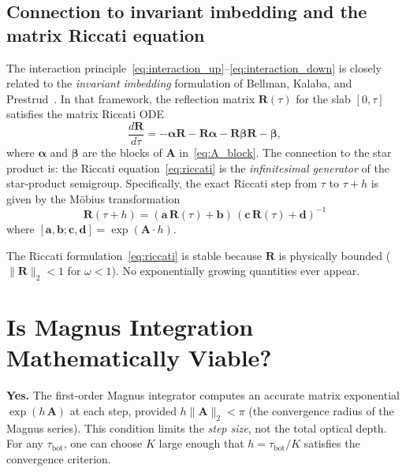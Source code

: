 \documentclass[11pt,a4paper]{article}
\newcommand{\mat}[1]{\mathbf{#1}}
\newcommand{\tbot}{\tau_{\mathrm{bot}}}
\theoremstyle{definition}
\begin{document}
\subsection{Connection to invariant imbedding and the matrix Riccati equation}

The interaction principle~\eqref{eq:interaction_up}--\eqref{eq:interaction_down}
is closely related to the \emph{invariant imbedding} formulation of
Bellman, Kalaba, and Prestrud~\cite{bellman1960}.  In that framework, the
reflection matrix $\mat{R}(\tau)$ for the slab $[0,\tau]$ satisfies the
matrix Riccati ODE
\begin{equation}\label{eq:riccati}
  \frac{d\mat{R}}{d\tau} = -\mat{\alpha}\mat{R} - \mat{R}\mat{\alpha}
                            - \mat{R}\mat{\beta}\mat{R} - \mat{\beta},
\end{equation}
where $\mat{\alpha}$ and $\mat{\beta}$ are the blocks of $\mat{A}$
in~\eqref{eq:A_block}.  The connection to the star product is:
the Riccati equation~\eqref{eq:riccati} is the \emph{infinitesimal
generator} of the star-product semigroup.  Specifically, the exact Riccati
step from $\tau$ to $\tau+h$ is given by the M\"obius transformation
\begin{equation}\label{eq:mobius}
  \mat{R}(\tau+h) = (\mat{a}\,\mat{R}(\tau)+\mat{b})\,
                     (\mat{c}\,\mat{R}(\tau)+\mat{d})^{-1}
\end{equation}
where $[\mat{a},\mat{b};\mat{c},\mat{d}]=\exp(\mat{A}\cdot h)$.

The Riccati formulation~\eqref{eq:riccati} is stable because $\mat{R}$ is
physically bounded ($\|\mat{R}\|_2<1$ for $\omega<1$).  No exponentially
growing quantities ever appear.


\section{Is Magnus Integration Mathematically Viable?}\label{sec:viability}

\textbf{Yes.}  The first-order Magnus integrator computes an accurate
matrix exponential $\exp(h\,\mat{A})$ at each step, provided
$h\|\mat{A}\|_2 < \pi$ (the convergence radius of the Magnus series).
This condition limits the \emph{step size}, not the total optical depth.
For any $\tbot$, one can choose $K$ large enough that $h=\tbot/K$ satisfies
the convergence criterion.
\end{document}
